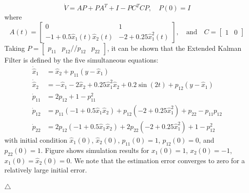 \documentclass[12pt,a4paper,oneside]{book}
\begin{document}
\begin{onehalfspace}
\begin{example}
\begin{equation*}
	\dot{V}=AP+PA^T+I-PC^TCP,\quad P(0)=I
\end{equation*}
where 
\begin{equation*}
	A(t)=\begin{bmatrix}
		0&1\\[6pt]-1+0.5\hat{x}_1(t)\hat{x}_2(t)&-2+0.25\hat{x}_1^2(t)	\end{bmatrix},\quad\text{and}\quad
	C=\begin{bmatrix} 1&0 \end{bmatrix}	
\end{equation*}
Taking $P=\begin{bmatrix} p_{11} & p_{12} // p_{12} & p_{22} \end{bmatrix}$, it can be shown that the Extended Kalman Filter is defined by the five simultaneous equations:
\begin{equation}
	\begin{aligned}
		\dot{\hat{x}}_1 &= \hat{x}_2+p_{11}(y-\hat{x}_1) \\[6pt]
		\dot{\hat{x}}_2 &= -\hat{x}_1 -2\hat{x}_2+0.25\hat{x}_1^2\hat{x}_2+0.2\sin(2t)+p_{12}(y-\hat{x}_1) \\[6pt]
		\dot{p}_{11} &= 2p_{12}+1-p_{11}^2 \\[6pt]
		\dot{p}_{12} &= p_{11}(-1+0.5\hat{x}_1\hat{x}_2)+p_{12}(-2+0.25\hat{x}_1^2)+p_{22}-p_{11}p_{12} \\[6pt]
		\dot{p}_{22} &= 2p_{12}(-1+0.5\hat{x}_1\hat{x}_2)+2p_{22}(-2+0.25\hat{x}_1^2)+1-p_{12}^2
	\end{aligned}
\end{equation}
with initial condition $\hat{x}_1(0)$, $\hat{x}_2(0)$, $p_{11}(0)=1$, $p_{12}(0)=0$, and $p_{22}(0)=1$. Figure shows simulation results for $x_1(0)=1$, $x_2(0)=-1$, $\hat{x}_1(0)=\hat{x}_2(0)=0$. We note that the estimation error converges to zero for a relatively large initial error.

\hfill$\triangle$
\end{example}





\end{onehalfspace}
\end{document}
